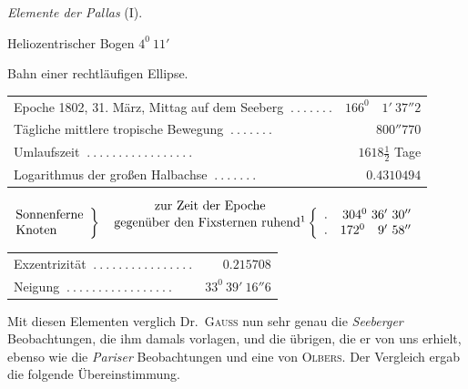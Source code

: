 \begin{center}
\textit{Elemente der Pallas} (I).\par\medskip
[Handschrift:] Heliozentrischer Bogen $4^0\ 11'$\par\medskip
Bahn einer rechtläufigen Ellipse.\par\medskip
{\small\setlength{\tabcolsep}{2pt}
\begin{tabular}{l r}
Epoche 1802, 31. März, Mittag auf dem Seeberg $\ .\ .\ .\ .\ .\ .\ .$&$166^0\quad1'\ 37''2$\\
Tägliche mittlere tropische Bewegung $\ .\ .\ .\ .\ .\ .\ .$&$800''770$\\
Umlaufszeit $\ .\ .\ .\ .\ .\ .\ .\ .\ .\ .\ .\ .\ .\ .\ .\ .\ .$&$1618\tfrac12$ Tage\\
Logarithmus der großen Halbachse $\ .\ .\ .\ .\ .\ .\ .$&$0.4310494$
\end{tabular}
\par\smallskip
$\left.\begin{array}{l}\text{Sonnenferne}\\\text{Knoten}\end{array}\right\}\quad
\text{\shortstack{zur Zeit der Epoche\\gegenüber den Fixsternen ruhend\footnotemark}}\left\{\begin{array}{lr}.&304^0\ 36'\ 30''\\.&172^0\quad9'\ 58''\end{array}\right.$
\par\smallskip
\begin{tabular}{l r}
Exzentrizität $\ .\ .\ .\ .\ .\ .\ .\ .\ .\ .\ .\ .\ .\ .\ .\ .$&$0.215708$\\
Neigung $\ .\ .\ .\ .\ .\ .\ .\ .\ .\ .\ .\ .\ .\ .\ .\ .\ .$&$33^0\ 39'\ 16''6$
\end{tabular}}
\end{center}
Mit diesen Elementen verglich Dr.\ \textsc{Gauß} nun sehr genau die \textit{Seeberger} Beobachtungen, die ihm damals vorlagen, und die übrigen, die er von uns erhielt, ebenso wie die \textit{Pariser} Beobachtungen und eine von \textsc{Olbers}. Der Vergleich ergab die folgende Übereinstimmung.
